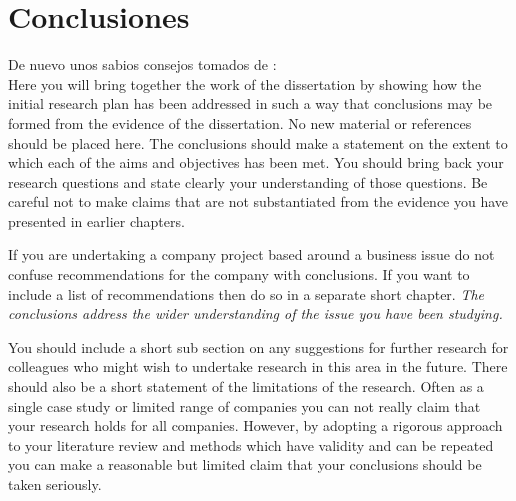 \chapter*{Conclusiones}

De nuevo unos sabios consejos tomados de \cite{guidedissertation}: \\
Here you will bring together the work of the dissertation by showing how the
initial research plan has been addressed in such a way that conclusions may be
formed from the evidence of the dissertation. No new material or references
should be placed here. The conclusions should make a statement on the extent
to which each of the aims and objectives has been met. You should bring back
your research questions and state clearly your understanding of those questions.
Be careful not to make claims that are not substantiated from the evidence you
have presented in earlier chapters.

If you are undertaking a company project based around a business issue do not
confuse recommendations for the company with conclusions. If you want to
include a list of recommendations then do so in a separate short chapter.
\emph{The conclusions address the wider understanding of the issue you have
been studying.}

You should include a short sub section on any suggestions for further research
for colleagues who might wish to undertake research in this area in the future.
There should also be a short statement of the limitations of the research. Often
as a single case study or limited range of companies you can not really claim
that your research holds for all companies. However, by adopting a rigorous
approach to your literature review and methods which have validity and can be
repeated you can make a reasonable but limited claim that your conclusions
should be taken seriously.

